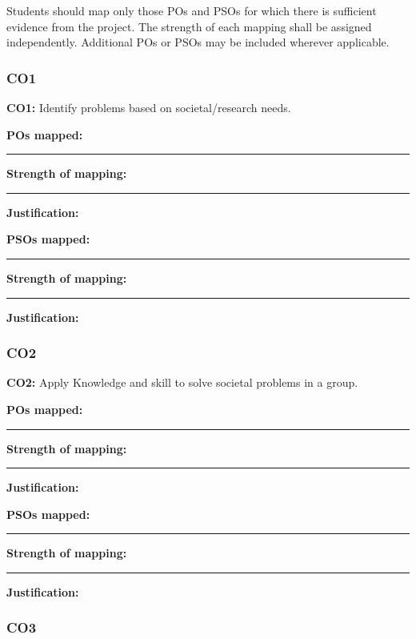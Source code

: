 \vspace{0.5cm}

Students should map only those POs and PSOs for which there is
sufficient evidence from the project. The strength of each mapping
shall be assigned independently. Additional POs or PSOs may be
included wherever applicable.

\subsubsection*{CO1}

\textbf{CO1:} Identify problems based on societal/research needs.

\vspace{0.3cm}

\textbf{POs mapped:} \rule{10cm}{0.4pt}

\textbf{Strength of mapping:} \rule{8.8cm}{0.4pt}

\textbf{Justification:}

\vspace{2cm}

\textbf{PSOs mapped:} \rule{10cm}{0.4pt}

\textbf{Strength of mapping:} \rule{8.8cm}{0.4pt}

\textbf{Justification:}

\vspace{2cm}

\subsubsection*{CO2}

\textbf{CO2:} Apply Knowledge and skill to solve societal problems in a group.

\vspace{0.3cm}

\textbf{POs mapped:} \rule{10cm}{0.4pt}

\textbf{Strength of mapping:} \rule{8.8cm}{0.4pt}

\textbf{Justification:}

\vspace{2cm}

\textbf{PSOs mapped:} \rule{10cm}{0.4pt}

\textbf{Strength of mapping:} \rule{8.8cm}{0.4pt}

\textbf{Justification:}

\vspace{2cm}

\subsubsection*{CO3}

